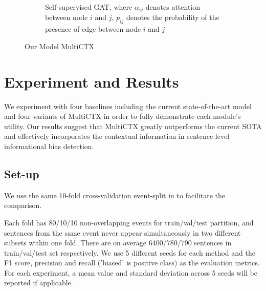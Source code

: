\documentclass[letterpaper]{article} %
\newcommand{\KZ}[1]{\textcolor{blue}{Kenny: #1}}
\begin{document}
\begin{figure}[!htbp]
\begin{subfigure}[t]{.3\linewidth}
{
  }
    \caption{\scriptsize Self-supervised GAT, where \textcolor{blue!60}{$\alpha_{ij}$} denotes attention between node $i$ and $j$, \textcolor{red!60}{$p_{ij}$} denotes the probability of the presence of edge between node $i$ and $j$}
\end{subfigure}
  \caption{ Our Model MultiCTX }
  \label{fig:model}
\end{figure}






\section{Experiment and Results}

We experiment with four baselines including the current state-of-the-art model and four variants of MultiCTX in order to fully demonstrate each module's utility. Our results suggest that MultiCTX greatly outperforms the current SOTA and effectively incorporates the contextual information in sentence-level informational bias detection.

\subsection{Set-up}

We use the same 10-fold cross-validation event-split in \citet{van-den-berg-markert-2020-context} to facilitate the comparison.

Each fold has 80/10/10 non-overlapping events for train/val/test partition, and sentences from the same event never appear simultaneously in two different subsets within one fold. There are on average 6400/780/790 sentences in train/val/test set respectively. We use 5 different seeds for each method and the F1 score, precision and recall ('biased' is positive class) as the evaluation metrics. For each experiment, a mean value and standard deviation across 5 seeds will be reported if applicable.
\end{document}
